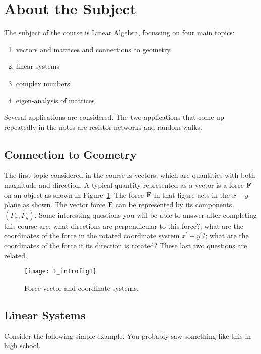 \section{About the Subject} 

The subject of the course is Linear Algebra, focussing on four main
topics: 
\begin{enumerate}
\item vectors and matrices and connections to geometry
\item linear systems
\item complex numbers 
\item eigen-analysis of matrices
\end{enumerate} 
Several applications are considered. The two applications that come up repeatedly in the notes are resistor networks and random walks. 

\subsection{Connection to Geometry}

The first topic considered in the course is vectors, which are
quantities with both magnitude and direction. A typical quantity
represented as a vector is a force $\bf F$ on an object as shown in
Figure~\ref{fig_intro1}. The force $\bf F$ in that figure acts in the
$x-y$ plane as shown. The vector force $\bf F$ can be represented by
its components $(F_x, F_y)$. Some interesting questions you will be
able to answer after completing this course are: what directions are
perpendicular to this force?; what are the coordinates of the force in
the rotated coordinate system $x^\prime - y^\prime$?; what are the
coordinates of the force if its direction is rotated? These last two
questions are related.
\begin{figure}
\centerline{\texttt{[image: 1\_introfig1]}}
\caption{\label{fig_intro1} Force vector and coordinate systems.}
\end{figure}

\subsection{Linear Systems}

Consider the following simple example. You probably saw something like
this in high school. 

